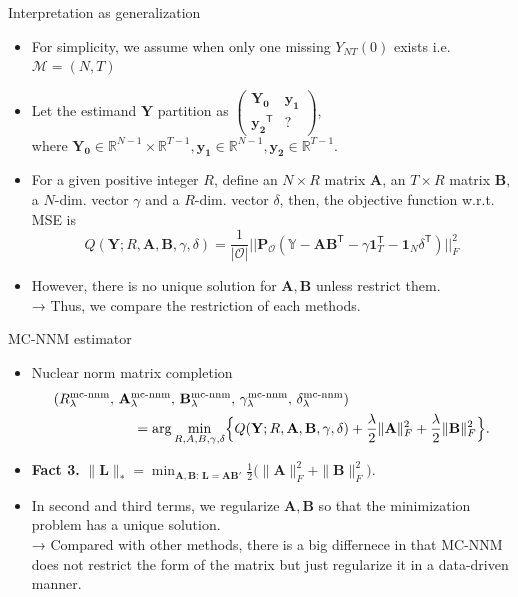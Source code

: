 \documentclass[xcolor=svgnames,aspectratio=169]{beamer}
\newcommand{\R}{\mathbb{R}}
\begin{document}
\begin{frame}{Interpretation as generalization}
    \begin{itemize}
        \item For simplicity, we assume when only one missing $Y_{NT}(0)$ exists i.e. $\mathcal{M}=(N,T)$ 
        \item Let the estimand $\mathbf{Y}$ partition as $
        \begin{pmatrix} \mathbf{Y_0} & \mathbf{y_1} \\ \mathbf{y_2}^{\mathsf{T}} & ? \end{pmatrix}$, \\ where $\mathbf{Y_0}\in\R^{N-1}\times \R^{T-1}, \mathbf{y_1}\in\R^{N-1}, \mathbf{y_2}\in\R^{T-1}$.
        \item For a given positive integer $R$, define an $N\times R$ matrix $\mathbf{A}$, an $T\times R$ matrix $\mathbf{B}$, a $N$-dim. vector $\gamma$ and a $R$-dim. vector $\delta$, then, the objective function w.r.t. MSE is
        \[
        Q(\mathbf{Y}; R, \mathbf{A}, \mathbf{B}, \gamma, \delta)=\frac{1}{|\mathcal{O} |} ||\mathbf{P_{\mathcal{O} }}({\mathbb{Y}-\mathbf{AB}^{\mathsf{T}}-\gamma}\mathbf{1}_T^{\mathsf{T}}-\mathbf{1}_N\delta^{\mathsf{T}})||_F^2
        \]
        \item However, there is no unique solution for $\mathbf{A, B}$ unless restrict them. \\
        → Thus, we compare the \alert{restriction} of each methods.
    \end{itemize}
\end{frame}

\begin{frame}{MC-NNM estimator}
    \begin{itemize}
        \item Nuclear norm matrix completion
        \begin{align*}
        (R_\lambda^{\mathrm{mc\text{-}nnm}},\,
         \mathbf{A}_\lambda^{\mathrm{mc\text{-}nnm}},\,
         \mathbf{B}_\lambda^{\mathrm{mc\text{-}nnm}},\,
         \gamma_\lambda^{\mathrm{mc\text{-}nnm}},\,
         \delta_\lambda^{\mathrm{mc\text{-}nnm}})& \\
        = \arg\min_{R,A,B,\gamma,\delta}
           \Bigl\{Q(\mathbf{Y};R,\mathbf{A},\mathbf{B},\gamma,\delta)
        &+\frac{\lambda}{2}\|\mathbf{A}\|_F^2
           +\frac{\lambda}{2}\|\mathbf{B}\|_F^2\Bigr\}.
        \end{align*}
        \item \textbf{Fact 3.} $\|\mathbf{L}\|_*
        = \min_{\mathbf{A},\mathbf{B}:\,\mathbf{L}=\mathbf{A}\mathbf{B}'}
          \frac{1}{2}\bigl(\|\mathbf{A}\|_F^2 + \|\mathbf{B}\|_F^2\bigr).$
        \item In second and third terms, we regularize $\mathbf{A, B}$ so that the minimization problem has a unique solution. \\
        → Compared with other methods, there is a big differnece in that MC-NNM does not restrict the form of the matrix but just regularize it in a data-driven manner.
  \end{itemize}
\end{frame}
\end{document}
